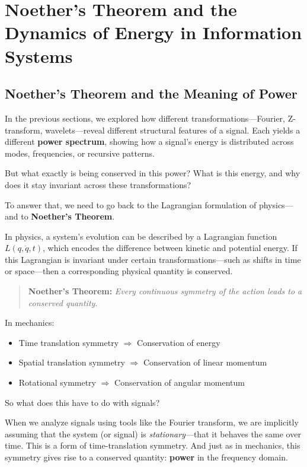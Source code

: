 \section{Noether's Theorem and the Dynamics of Energy in Information Systems}



\subsection{Noether's Theorem and the Meaning of Power}

In the previous sections, we explored how different transformations—Fourier, Z-transform, wavelets—reveal different structural features of a signal. Each yields a different \textbf{power spectrum}, showing how a signal’s energy is distributed across modes, frequencies, or recursive patterns.

But what exactly is being conserved in this power? What is this energy, and why does it stay invariant across these transformations?

To answer that, we need to go back to the Lagrangian formulation of physics—and to \textbf{Noether’s Theorem}.

\vspace{1em}
\noindent
In physics, a system’s evolution can be described by a Lagrangian function \( L(q, \dot{q}, t) \), which encodes the difference between kinetic and potential energy. If this Lagrangian is invariant under certain transformations—such as shifts in time or space—then a corresponding physical quantity is conserved.

\begin{quote}
\textbf{Noether’s Theorem:} \emph{Every continuous symmetry of the action leads to a conserved quantity.}
\end{quote}

In mechanics:
\begin{itemize}
    \item Time translation symmetry \( \Rightarrow \) Conservation of energy
    \item Spatial translation symmetry \( \Rightarrow \) Conservation of linear momentum
    \item Rotational symmetry \( \Rightarrow \) Conservation of angular momentum
\end{itemize}

So what does this have to do with signals?

When we analyze signals using tools like the Fourier transform, we are implicitly assuming that the system (or signal) is \emph{stationary}—that it behaves the same over time. This is a form of time-translation symmetry. And just as in mechanics, this symmetry gives rise to a conserved quantity: \textbf{power} in the frequency domain.

